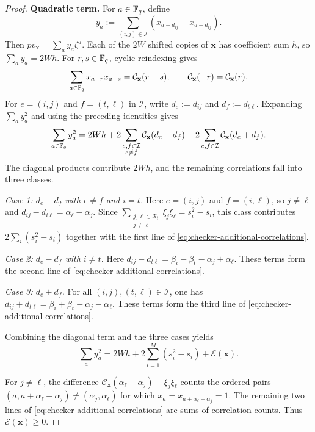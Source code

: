 \begin{proof}
\noindent\textbf{Quadratic term.}
For $a\in\mathbb F_q$, define
\begin{equation*}
 y_a:=\sum_{(i,j)\in\mathcal I}
      (x_{a-d_{ij}}+x_{a+d_{ij}}).
\end{equation*}
Then $pv_{\mathbf x}=\sum_a y_a\zeta^a$.  Each of the $2W$ shifted copies
of $\mathbf x$ has coefficient sum $h$, so $\sum_a y_a=2Wh$.  For
$r,s\in\mathbb F_q$, cyclic reindexing gives
\[
 \sum_{a\in\mathbb F_q}x_{a-r}x_{a-s}
 =\mathcal{C}_{\mathbf x}(r-s),
 \qquad
 \mathcal{C}_{\mathbf x}(-r)=\mathcal{C}_{\mathbf x}(r).
\]
For $e=(i,j)$ and $f=(t,\ell)$ in $\mathcal I$, write
$d_e:=d_{ij}$ and $d_f:=d_{t\ell}$.  Expanding $\sum_a y_a^2$ and using
the preceding identities gives
\begin{equation*}
 \sum_{a\in\mathbb F_q}y_a^2
 =2Wh+2\sum_{\substack{e,f\in\mathcal I\\e\ne f}}\mathcal{C}_{\mathbf x}(d_e-d_f)
 +2\sum_{e,f\in\mathcal I}\mathcal{C}_{\mathbf x}(d_e+d_f).
\end{equation*}
The diagonal products contribute $2Wh$, and the remaining correlations fall
into three classes.

\smallskip
\noindent\emph{Case 1: $d_e-d_f$ with $e\ne f$ and $i=t$.}
Here $e=(i,j)$ and $f=(i,\ell)$, so $j\ne\ell$ and
$d_{ij}-d_{i\ell}=\alpha_\ell-\alpha_j$.
Since
$\sum_{\substack{j,\ell\in\mathcal R_i\\j\ne\ell}}
\xi_j\xi_\ell=s_i^2-s_i$, this class contributes
$2\sum_i(s_i^2-s_i)$ together with the first line of
\cref{eq:checker-additional-correlations}.

\smallskip
\noindent\emph{Case 2: $d_e-d_f$ with $i\ne t$.}
Here $d_{ij}-d_{t\ell}=\beta_i-\beta_t-\alpha_j+\alpha_\ell$.
These terms form the second line of
\cref{eq:checker-additional-correlations}.

\smallskip
\noindent\emph{Case 3: $d_e+d_f$.}
For all $(i,j),(t,\ell)\in\mathcal I$, one has
$d_{ij}+d_{t\ell}=\beta_i+\beta_t-\alpha_j-\alpha_\ell$.
These terms form the third line of
\cref{eq:checker-additional-correlations}.

Combining the diagonal term and the three cases yields
\begin{equation*}
 \sum_a y_a^2
 =2Wh+2\sum_{i=1}^M(s_i^2-s_i)+\mathcal E(\mathbf x).
\end{equation*}

For $j\ne\ell$, the difference
$\mathcal C_{\mathbf x}(\alpha_\ell-\alpha_j)-\xi_j\xi_\ell$
counts the ordered pairs
$(a,a+\alpha_\ell-\alpha_j)\ne(\alpha_j,\alpha_\ell)$ for which
$x_a=x_{a+\alpha_\ell-\alpha_j}=1$.  The remaining two lines of
\cref{eq:checker-additional-correlations} are sums of correlation
counts.  Thus $\mathcal E(\mathbf x)\ge0$.


\end{proof}
